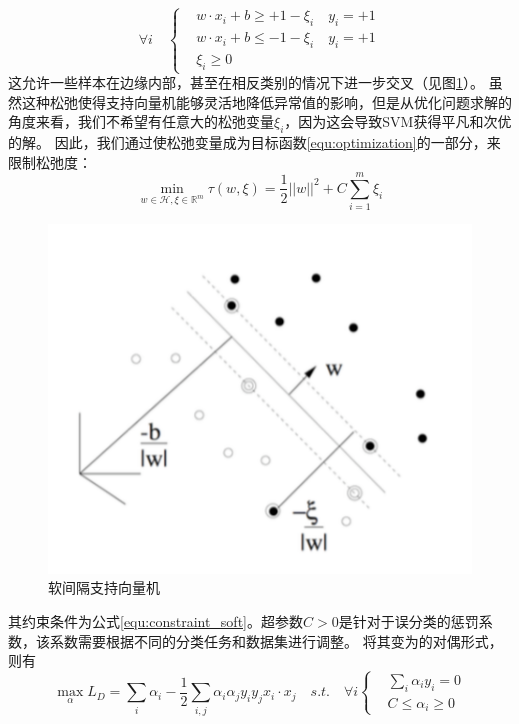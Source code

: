 \begin{equation}
	\forall i \quad
	\left\{
	 \begin{aligned}
	&w\cdot x_i + b \geq +1-\xi_i \quad y_i=+1  \\
	&w\cdot x_i + b \leq -1-\xi_i \quad y_i=+1  \\
	&\xi_i \geq 0
	\end{aligned}
	 \right.
	\label{equ:constraint_soft}
\end{equation}
这允许一些样本在边缘内部，甚至在相反类别的情况下进一步交叉（见图\ref{fig:softmargin}）。 虽然这种松弛使得支持向量机能够灵活地降低异常值的影响，但是从优化问题求解的角度来看，我们不希望有任意大的松弛变量$\xi_i$，因为这会导致SVM获得平凡和次优的解。 因此，我们通过使松弛变量成为目标函数\ref{equ:optimization}的一部分，来限制松弛度：
\begin{equation}
	\min \limits_{w\in \mathcal{H},\xi\in \mathbb{R}^m} \tau(w,\xi)=\frac{1}{2}||w||^2+C\sum_{i=1}^m {\xi_i}
\end{equation}
\begin{figure}[H]
	\centering
	\includegraphics[width=\textwidth]{figures/softmargin}
	\caption{软间隔支持向量机}
	\label{fig:softmargin}
\end{figure}
其约束条件为公式\ref{equ:constraint_soft}。超参数$C>0$是针对于误分类的惩罚系数，该系数需要根据不同的分类任务和数据集进行调整。
将其变为的对偶形式，则有
\begin{equation}
	\max \limits_{\alpha} L_D=\sum_i{\alpha_i}-\frac{1}{2}\sum_{i,j}\alpha_i\alpha_jy_iy_jx_i\cdot x_j \quad s.t. \quad \forall i 
	\left\{
		\begin{aligned}
	   &\sum_i{\alpha_iy_i}=0  \\
	   &C \leq \alpha_i \geq 0
	   \end{aligned}
		\right.
	\label{equ:cdotdual}
\end{equation}


